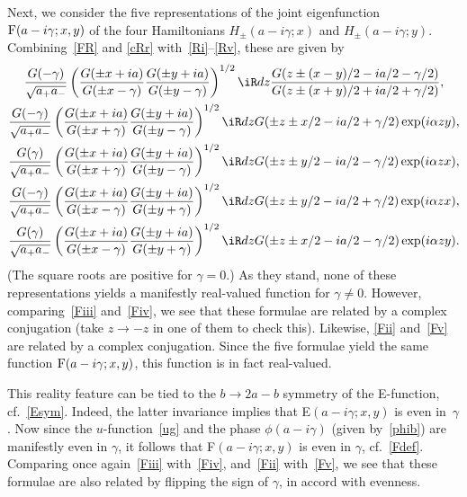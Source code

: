 \documentclass[pdftex]{sigma}
\numberwithin{equation}{section}
\begin{document}
Next, we consider the f\/ive representations of the joint eigenfunction ${\rm F}(a-i\gamma;x,y)$ of the four Hamiltonians $H_{\pm}(a-i\gamma;x)$ and $H_{\pm}(a-i\gamma;y)$. Combining~\eqref{FR} and \eqref{cRr} with~\eqref{Ri}--\eqref{Rv}, these are given by
\begin{gather}\label{Fi}
\frac{G(-\gamma)}{\sqrt{a_{+}a_-}}\left(\frac{G(\pm x +ia)}{G(\pm x -\gamma)}\frac{G(\pm y +ia)}{G(\pm y -\gamma)}\right)^{1/2}\iR dz \frac{G(z\pm (x-y)/2-ia/2-\gamma/2)}{G(z\pm (x+y)/2+ia/2+\gamma/2)},
\\
\label{Fii}
\frac{G(-\gamma)}{\sqrt{a_{+}a_-}}\left(\frac{G(\pm x +ia)}{G(\pm x +\gamma)}\frac{G(\pm y +ia)}{G(\pm y -\gamma)}\right)^{1/2}\iR dz G(\pm z\pm x/2-ia/2+\gamma/2)\exp(i\alpha zy),
\\
\label{Fiii}
\frac{G(\gamma)}{\sqrt{a_{+}a_-}}\left(\frac{G(\pm x +ia)}{G(\pm x +\gamma)}\frac{G(\pm y +ia)}{G(\pm y -\gamma)}\right)^{1/2}\iR dz G(\pm z\pm y/2-ia/2-\gamma/2)\exp(i\alpha zx),
\\
\label{Fiv}
\frac{G(-\gamma)}{\sqrt{a_{+}a_-}}\left(\frac{G(\pm x +ia)}{G(\pm x -\gamma)}\frac{G(\pm y +ia)}{G(\pm y +\gamma)}\right)^{1/2}\iR dz G(\pm z\pm y/2-ia/2+\gamma/2)\exp(i\alpha zx),
\\
\label{Fv}
\frac{G(\gamma)}{\sqrt{a_{+}a_-}}\left(\frac{G(\pm x +ia)}{G(\pm x -\gamma)}\frac{G(\pm y +ia)}{G(\pm y +\gamma)}\right)^{1/2}\iR dz G(\pm z\pm x/2-ia/2-\gamma/2)\exp(i\alpha zy).
\end{gather}
(The square roots are positive for $\gamma=0$.) As they stand, none of these representations yields a manifestly real-valued function for $\gamma\ne 0$. However, comparing~\eqref{Fiii} and~\eqref{Fiv}, we see that these formulae are related by a complex conjugation (take $z\to -z$ in one of them to check this).
Likewise, \eqref{Fii} and~\eqref{Fv} are related by a complex conjugation. Since the f\/ive formulae yield the same function
${\rm F}(a-i\gamma;x,y)$, this function is in fact real-valued.

This reality feature can be tied to the $b\to 2a-b$ symmetry of the E-function, cf.~\eqref{Esym}. Indeed, the latter invariance implies that E$(a-i\gamma;x,y)$ is even in~$\gamma$. Now since the $u$-function~\eqref{ug} and the phase $\phi(a-i\gamma)$ (given by~\eqref{phib}) are manifestly even in $\gamma$, it follows that F$(a-i\gamma;x,y)$ is even in $\gamma$, cf.~\eqref{Fdef}. Comparing once again~\eqref{Fiii} with~\eqref{Fiv}, and~\eqref{Fii} with~\eqref{Fv}, we see that these formulae are also related by f\/lipping the sign of $\gamma$, in accord with evenness.
\end{document}
